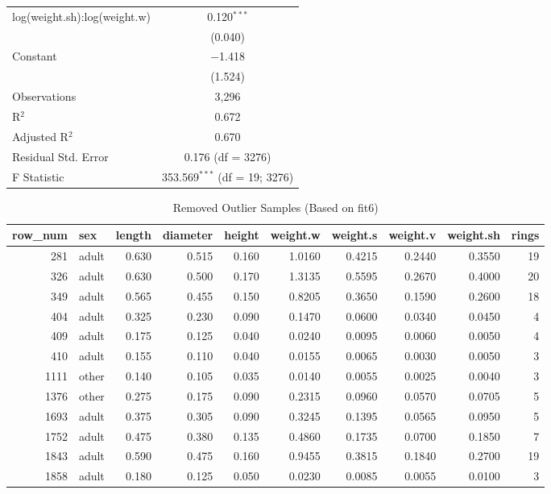 \documentclass[12pt]{article}
\begin{document}
{\begin{longtable}{@{\extracolsep{5pt}}lc}
			log(weight.sh):log(weight.w) & 0.120$^{***}$ \\ 
			& (0.040) \\[0.4ex]
			Constant       & $-$1.418 \\ 
			& (1.524) \\[0.4ex]
			Observations   & 3,296 \\ 
			R$^{2}$        & 0.672 \\ 
			Adjusted R$^{2}$ & 0.670 \\ 
			Residual Std. Error & 0.176 (df = 3276) \\ 
			F Statistic    & 353.569$^{***}$ (df = 19; 3276) \\ 
		\end{longtable}
	}
	
	\begin{table}[!h]
		\centering
		\caption{\label{tab:ip}Removed Outlier Samples (Based on fit6)}
		\begin{tabular}{r l r r r r r r r r}
			\toprule
			row\_num & sex & length & diameter & height & weight.w & weight.s & weight.v & weight.sh & rings\\
			\midrule
			281  & adult & 0.630 & 0.515 & 0.160 & 1.0160 & 0.4215 & 0.2440 & 0.3550 & 19\\
			326  & adult & 0.630 & 0.500 & 0.170 & 1.3135 & 0.5595 & 0.2670 & 0.4000 & 20\\
			349  & adult & 0.565 & 0.455 & 0.150 & 0.8205 & 0.3650 & 0.1590 & 0.2600 & 18\\
			404  & adult & 0.325 & 0.230 & 0.090 & 0.1470 & 0.0600 & 0.0340 & 0.0450 & 4\\
			409  & adult & 0.175 & 0.125 & 0.040 & 0.0240 & 0.0095 & 0.0060 & 0.0050 & 4\\
			410  & adult & 0.155 & 0.110 & 0.040 & 0.0155 & 0.0065 & 0.0030 & 0.0050 & 3\\
			1111 & other & 0.140 & 0.105 & 0.035 & 0.0140 & 0.0055 & 0.0025 & 0.0040 & 3\\
			1376 & other & 0.275 & 0.175 & 0.090 & 0.2315 & 0.0960 & 0.0570 & 0.0705 & 5\\
			1693 & adult & 0.375 & 0.305 & 0.090 & 0.3245 & 0.1395 & 0.0565 & 0.0950 & 5\\
			1752 & adult & 0.475 & 0.380 & 0.135 & 0.4860 & 0.1735 & 0.0700 & 0.1850 & 7\\
			1843 & adult & 0.590 & 0.475 & 0.160 & 0.9455 & 0.3815 & 0.1840 & 0.2700 & 19\\
			1858 & adult & 0.180 & 0.125 & 0.050 & 0.0230 & 0.0085 & 0.0055 & 0.0100 & 3\\

\end{tabular}
\end{table}
\end{document}
